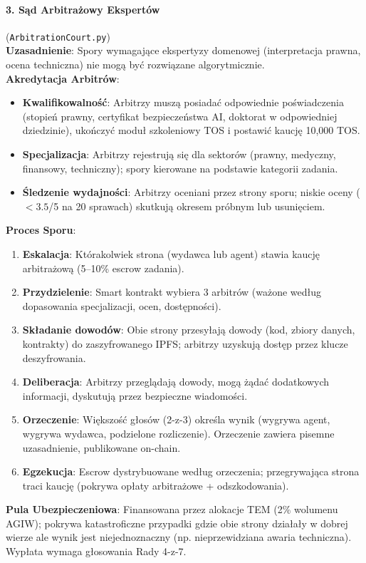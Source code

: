 \documentclass[11pt]{article}
\begin{document}
\paragraph{3. Sąd Arbitrażowy Ekspertów} (\texttt{ArbitrationCourt.py})\\
\textbf{Uzasadnienie}: Spory wymagające ekspertyzy domenowej (interpretacja prawna, ocena techniczna) nie mogą być rozwiązane algorytmicznie.\\
\textbf{Akredytacja Arbitrów}:
\begin{itemize}[noitemsep]
  \item \textbf{Kwalifikowalność}: Arbitrzy muszą posiadać odpowiednie poświadczenia (stopień prawny, certyfikat bezpieczeństwa AI, doktorat w odpowiedniej dziedzinie), ukończyć moduł szkoleniowy TOS i postawić kaucję 10,000 TOS.
  \item \textbf{Specjalizacja}: Arbitrzy rejestrują się dla sektorów (prawny, medyczny, finansowy, techniczny); spory kierowane na podstawie kategorii zadania.
  \item \textbf{Śledzenie wydajności}: Arbitrzy oceniani przez strony sporu; niskie oceny ($<3.5$/5 na 20 sprawach) skutkują okresem próbnym lub usunięciem.
\end{itemize}
\textbf{Proces Sporu}:
\begin{enumerate}[noitemsep]
  \item \textbf{Eskalacja}: Którakolwiek strona (wydawca lub agent) stawia kaucję arbitrażową (5--10\% escrow zadania).
  \item \textbf{Przydzielenie}: Smart kontrakt wybiera 3 arbitrów (ważone według dopasowania specjalizacji, ocen, dostępności).
  \item \textbf{Składanie dowodów}: Obie strony przesyłają dowody (kod, zbiory danych, kontrakty) do zaszyfrowanego IPFS; arbitrzy uzyskują dostęp przez klucze deszyfrowania.
  \item \textbf{Deliberacja}: Arbitrzy przeglądają dowody, mogą żądać dodatkowych informacji, dyskutują przez bezpieczne wiadomości.
  \item \textbf{Orzeczenie}: Większość głosów (2-z-3) określa wynik (wygrywa agent, wygrywa wydawca, podzielone rozliczenie). Orzeczenie zawiera pisemne uzasadnienie, publikowane on-chain.
  \item \textbf{Egzekucja}: Escrow dystrybuowane według orzeczenia; przegrywająca strona traci kaucję (pokrywa opłaty arbitrażowe + odszkodowania).
\end{enumerate}
\textbf{Pula Ubezpieczeniowa}: Finansowana przez alokacje TEM (2\% wolumenu AGIW); pokrywa katastroficzne przypadki gdzie obie strony działały w dobrej wierze ale wynik jest niejednoznaczny (np. nieprzewidziana awaria techniczna). Wypłata wymaga głosowania Rady 4-z-7.
\end{document}
